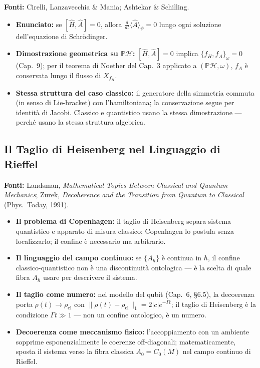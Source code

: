 \documentclass[12pt, a4paper]{article}
\newcommand{\fonti}[1]{%
	\begin{fontebox}
		\textcolor{fontecolor}{\footnotesize\textbf{Fonti:} #1}
	\end{fontebox}%
}
\begin{document}
	\fonti{Cirelli, Lanzavecchia \& Mania; Ashtekar \& Schilling.}
	
	\begin{itemize}
		\item \textbf{Enunciato:} se $[\hat{H}, \hat{A}] = 0$, allora
		$\frac{d}{dt}\langle\hat{A}\rangle_\psi = 0$ lungo ogni soluzione dell'equazione
		di Schrödinger.
		\item \textbf{Dimostrazione geometrica su $\mathbb{P}\mathcal{H}$:} $[\hat{H}, \hat{A}]
		= 0$ implica $\{f_H, f_A\}_\omega = 0$ (Cap.\ 9); per il teorema di Noether del
		Cap.\ 3 applicato a $(\mathbb{P}\mathcal{H}, \omega)$, $f_A$ è conservata lungo
		il flusso di $X_{f_H}$.
		\item \textbf{Stessa struttura del caso classico:} il generatore della simmetria
		commuta (in senso di Lie-bracket) con l'hamiltoniana; la conservazione segue
		per identità di Jacobi. Classico e quantistico usano la stessa dimostrazione ---
		perché usano la stessa struttura algebrica.
	\end{itemize}
	
	\subsection{Il Taglio di Heisenberg nel Linguaggio di Rieffel}
	
	\fonti{Landsman, \textit{Mathematical Topics Between Classical and Quantum Mechanics};
		Zurek, \textit{Decoherence and the Transition from Quantum to Classical}
		(Phys.\ Today, 1991).}
	
	\begin{itemize}
		\item \textbf{Il problema di Copenhagen:} il taglio di Heisenberg separa sistema
		quantistico e apparato di misura classico; Copenhagen lo postula senza localizzarlo;
		il confine è necessario ma arbitrario.
		\item \textbf{Il linguaggio del campo continuo:} se $\{A_\hbar\}$ è continua in
		$\hbar$, il confine classico-quantistico non è una discontinuità ontologica ---
		è la scelta di quale fibra $A_\hbar$ usare per descrivere il sistema.
		\item \textbf{Il taglio come numero:} nel modello del qubit (Cap.\ 6, §6.5),
		la decoerenza porta $\rho(t) \to \rho_{\mathrm{cl}}$ con
		$\|\rho(t) - \rho_{\mathrm{cl}}\|_1 = 2|c|e^{-\Gamma t}$; il taglio di
		Heisenberg è la condizione $\Gamma t \gg 1$ --- non un confine ontologico, è
		un numero.
		\item \textbf{Decoerenza come meccanismo fisico:} l'accoppiamento con un ambiente
		sopprime esponenzialmente le coerenze off-diagonali; matematicamente, sposta
		il sistema verso la fibra classica $A_0 = C_0(M)$ nel campo continuo di Rieffel.
	\end{itemize}
	
\end{document}
